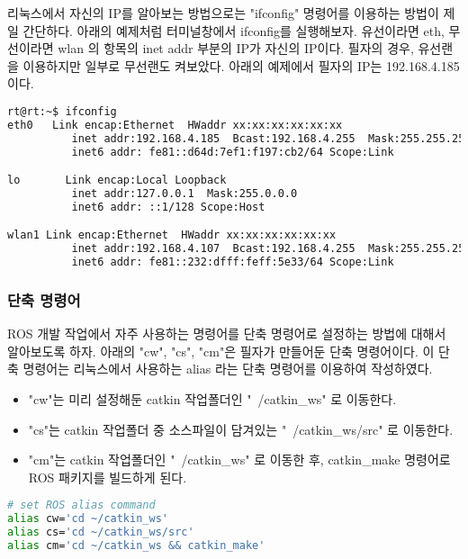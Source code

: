 \begin{exercise}[ifconfig]
리눅스에서 자신의 IP를 알아보는 방법으로는 "ifconfig" 명령어를 이용하는 방법이 제일 간단하다. 아래의 예제처럼 터미널창에서 ifconfig를 실행해보자. 유선이라면 eth, 무선이라면 wlan 의 항목의 inet addr 부분의 IP가 자신의 IP이다. 필자의 경우, 유선랜을 이용하지만 일부로 무선랜도 켜보았다. 아래의 예제에서 필자의 IP는 192.168.4.185 이다.
\begin{lstlisting}[language=bash, backgroundcolor=\color{ocre!10}, numbers=none]
rt@rt:~$ ifconfig
eth0   Link encap:Ethernet  HWaddr xx:xx:xx:xx:xx:xx  
          inet addr:192.168.4.185  Bcast:192.168.4.255  Mask:255.255.255.0
          inet6 addr: fe81::d64d:7ef1:f197:cb2/64 Scope:Link

lo       Link encap:Local Loopback  
          inet addr:127.0.0.1  Mask:255.0.0.0
          inet6 addr: ::1/128 Scope:Host

wlan1 Link encap:Ethernet  HWaddr xx:xx:xx:xx:xx:xx
          inet addr:192.168.4.107  Bcast:192.168.4.255  Mask:255.255.255.0
          inet6 addr: fe81::232:dfff:feff:5e33/64 Scope:Link
\end{lstlisting}
\end{exercise}

\subsubsection{단축 명령어}
ROS 개발 작업에서 자주 사용하는 명령어를 단축 명령어로 설정하는 방법에 대해서 알아보도록 하자. 아래의 "cw", "cs", "cm"은 필자가 만들어둔 단축 명령어이다. 이 단축 명령어는 리눅스에서 사용하는 alias 라는 단축 명령어를 이용하여 작성하였다. 

\begin{itemize}
\item "cw"는 미리 설정해둔 catkin 작업폴더인 "~/catkin\_ws" 로 이동한다. 
\item "cs"는 catkin 작업폴더 중 소스파일이 담겨있는 "~/catkin\_ws/src" 로 이동한다. 
\item "cm"는 catkin 작업폴더인 "~/catkin\_ws" 로 이동한 후, catkin\_make 명령어로 ROS 패키지를 빌드하게 된다.
\end{itemize}

\begin{lstlisting}[language=bash]
# set ROS alias command
alias cw='cd ~/catkin_ws'
alias cs='cd ~/catkin_ws/src'
alias cm='cd ~/catkin_ws && catkin_make'
\end{lstlisting}

